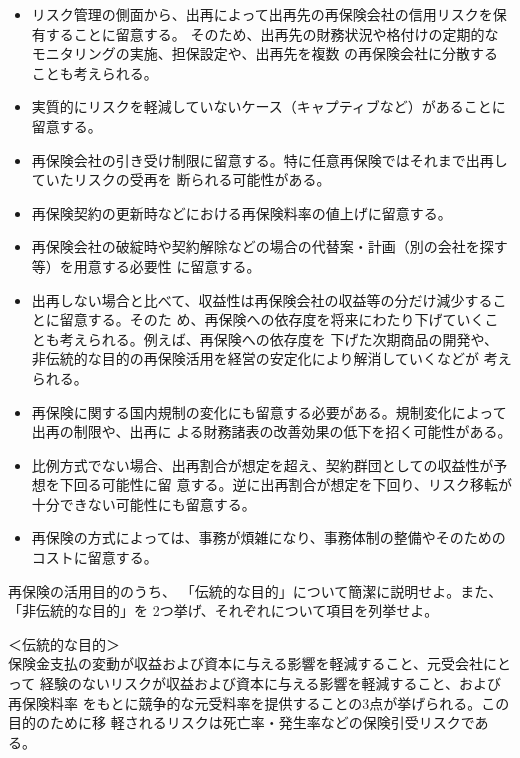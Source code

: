 \documentclass[report,gutter=10mm,fore-edge=10mm,uplatex,dvipdfmx]{jlreq}
\begin{document}
\begin{itemize}
\item[] リスク管理の側面から、出再によって出再先の再保険会社の信用リスクを保有することに留意する。
そのため、出再先の財務状況や格付けの定期的なモニタリングの実施、担保設定や、出再先を複数
の再保険会社に分散することも考えられる。
\item[] 実質的にリスクを軽減していないケース（キャプティブなど）があることに留意する。
\item[] 再保険会社の引き受け制限に留意する。特に任意再保険ではそれまで出再していたリスクの受再を
断られる可能性がある。
\item[] 再保険契約の更新時などにおける再保険料率の値上げに留意する。
\item[] 再保険会社の破綻時や契約解除などの場合の代替案・計画（別の会社を探す等）を用意する必要性
に留意する。
\item[] 出再しない場合と比べて、収益性は再保険会社の収益等の分だけ減少することに留意する。そのた
め、再保険への依存度を将来にわたり下げていくことも考えられる。例えば、再保険への依存度を
下げた次期商品の開発や、非伝統的な目的の再保険活用を経営の安定化により解消していくなどが
考えられる。
\item[] 再保険に関する国内規制の変化にも留意する必要がある。規制変化によって出再の制限や、出再に
よる財務諸表の改善効果の低下を招く可能性がある。
\item[] 比例方式でない場合、出再割合が想定を超え、契約群団としての収益性が予想を下回る可能性に留
意する。逆に出再割合が想定を下回り、リスク移転が十分できない可能性にも留意する。
\item[] 再保険の方式によっては、事務が煩雑になり、事務体制の整備やそのためのコストに留意する。
\end{itemize}



再保険の活用目的のうち、
「伝統的な目的」について簡潔に説明せよ。また、
「非伝統的な目的」を 2つ挙げ、それぞれについて項目を列挙せよ。
\answer{}

\noindent ＜伝統的な目的＞\\
保険金支払の変動が収益および資本に与える影響を軽減すること、元受会社にとって
経験のないリスクが収益および資本に与える影響を軽減すること、および再保険料率
をもとに競争的な元受料率を提供することの3点が挙げられる。この目的のために移
軽されるリスクは死亡率・発生率などの保険引受リスクである。
\end{document}
